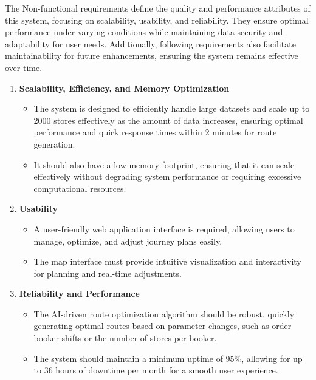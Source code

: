 
The Non-functional requirements define the quality and performance attributes of this system, focusing on scalability, usability, and reliability. They ensure optimal performance under varying conditions while maintaining data security and adaptability for user needs. Additionally, following requirements also facilitate maintainability for future enhancements, ensuring the system remains effective over time.








\begin{enumerate}
    \item \textbf{Scalability, Efficiency, and Memory Optimization}
    \begin{itemize}
        \item The system is designed to efficiently handle large datasets and scale up to 2000 stores effectively as the amount of data increases, ensuring optimal performance and quick response times within 2 minutes for route generation.
        \item It should also have a low memory footprint, ensuring that it can scale effectively without degrading system performance or requiring excessive computational resources.
    \end{itemize}
    
    \item \textbf{Usability}
    \begin{itemize}
        \item A user-friendly web application interface is required, allowing users to manage, optimize, and adjust journey plans easily.
        \item The map interface must provide intuitive visualization and interactivity for planning and real-time adjustments.
    \end{itemize}
    \newpage
    \item \textbf{Reliability and Performance}
    \begin{itemize}
        \item The AI-driven route optimization algorithm should be robust, quickly generating optimal routes based on parameter changes, such as order booker shifts or the number of stores per booker.
        \item The system should maintain a minimum uptime of 95\%, allowing for up to 36 hours of downtime per month for a smooth user experience.
        

\end{itemize}
\end{enumerate}
